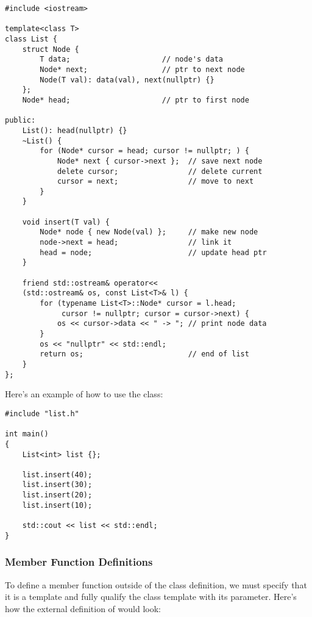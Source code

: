 \documentclass[12pt]{article}
\begin{document}
\begin{lstlisting}[style=cxx]
#include <iostream>

template<class T>
class List {
    struct Node {
        T data;                     // node's data
        Node* next;                 // ptr to next node
        Node(T val): data(val), next(nullptr) {}
    };
    Node* head;                     // ptr to first node

public:
    List(): head(nullptr) {}
    ~List() {
        for (Node* cursor = head; cursor != nullptr; ) {
            Node* next { cursor->next };  // save next node
            delete cursor;                // delete current
            cursor = next;                // move to next
        }
    }

    void insert(T val) {
        Node* node { new Node(val) };     // make new node
        node->next = head;                // link it
        head = node;                      // update head ptr
    }

    friend std::ostream& operator<<
    (std::ostream& os, const List<T>& l) {
        for (typename List<T>::Node* cursor = l.head;
             cursor != nullptr; cursor = cursor->next) {
            os << cursor->data << " -> "; // print node data
        }
        os << "nullptr" << std::endl;
        return os;                        // end of list
    }
};
\end{lstlisting}

\noindent
Here’s an example of how to use the  class:

\begin{lstlisting}[style=cxx]
#include "list.h"

int main()
{
    List<int> list {};

    list.insert(40);
    list.insert(30);
    list.insert(20);
    list.insert(10);

    std::cout << list << std::endl;
}
\end{lstlisting}


\subsubsection{Member Function Definitions}

\noindent
To define a member function outside of the class definition, we must specify that it is a template and fully qualify the class template with its parameter.
Here’s how the external definition of  would look:
\end{document}

